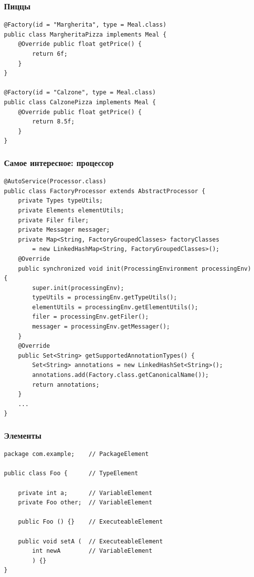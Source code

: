 \documentclass[xetex,mathserif,serif]{beamer}
\begin{document}
	\begin{frame}[fragile]
		\frametitle{Пиццы}
		\begin{small}
			\begin{verbatim}
@Factory(id = "Margherita", type = Meal.class)
public class MargheritaPizza implements Meal {
    @Override public float getPrice() {
        return 6f;
    }
}

@Factory(id = "Calzone", type = Meal.class)
public class CalzonePizza implements Meal {
    @Override public float getPrice() {
        return 8.5f;
    }
}
			\end{verbatim}
		\end{small}
	\end{frame}

	\begin{frame}[fragile]
		\frametitle{Самое интересное: процессор}
		\begin{scriptsize}
			\begin{verbatim}
@AutoService(Processor.class)
public class FactoryProcessor extends AbstractProcessor {
    private Types typeUtils;
    private Elements elementUtils;
    private Filer filer;
    private Messager messager;
    private Map<String, FactoryGroupedClasses> factoryClasses 
        = new LinkedHashMap<String, FactoryGroupedClasses>();
    @Override
    public synchronized void init(ProcessingEnvironment processingEnv) {
        super.init(processingEnv);
        typeUtils = processingEnv.getTypeUtils();
        elementUtils = processingEnv.getElementUtils();
        filer = processingEnv.getFiler();
        messager = processingEnv.getMessager();
    }
    @Override
    public Set<String> getSupportedAnnotationTypes() {
        Set<String> annotations = new LinkedHashSet<String>();
        annotations.add(Factory.class.getCanonicalName());
        return annotations;
    }
    ...
}
			\end{verbatim}
		\end{scriptsize}
	\end{frame}

	\begin{frame}[fragile]
		\frametitle{Элементы}
		\begin{small}
			\begin{verbatim}
package com.example;    // PackageElement

public class Foo {      // TypeElement

    private int a;      // VariableElement
    private Foo other;  // VariableElement

    public Foo () {}    // ExecuteableElement

    public void setA (  // ExecuteableElement
        int newA        // VariableElement
        ) {}
}
			\end{verbatim}
		\end{small}
	\end{frame}
\end{document}
